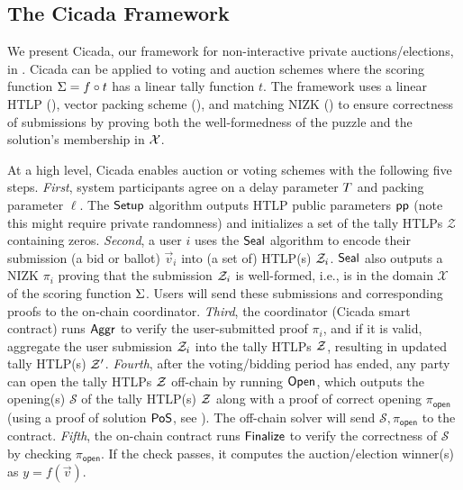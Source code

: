 \subsection{The Cicada Framework}

We present Cicada, our framework for non-interactive private auctions/elections, in . Cicada can be applied to voting and auction schemes where the scoring function $\Sigma = f \circ t$ has a linear tally function $t$. The framework uses a linear HTLP (), vector packing scheme (), and matching NIZK () to ensure correctness of submissions by proving both the well-formedness of the puzzle and the solution's membership in $\mathcal{X}$.

At a high level, Cicada enables auction or voting schemes with the following five steps. 
\emph{First}, system participants agree on a delay parameter $T$ and packing parameter $\ell$. The $\mathsf{Setup}$ algorithm outputs HTLP public parameters $\mathsf{pp}$ (note this might require private randomness) and initializes a set of the tally HTLPs $\mathcal{Z}$ containing zeros. 
\emph{Second}, a user $i$ uses the $\mathsf{Seal}$ algorithm to encode their submission (a bid or ballot) $\vec{v}_i$ into (a set of) HTLP(s) $\mathcal{Z}_i$. $\mathsf{Seal}$ also outputs a NIZK $\pi_i$ proving that the submission $\mathcal{Z}_i$ is well-formed, i.e., is in the domain $\mathcal{X}$ of the scoring function $\Sigma$. Users will send these submissions and corresponding proofs to the on-chain coordinator. 
\emph{Third}, the coordinator (Cicada smart contract) runs $\mathsf{Aggr}$ to verify the user-submitted proof $\pi_i$, and if it is valid, aggregate the user submission $\mathcal{Z}_i$ into the tally HTLPs $\mathcal{Z}$, resulting in updated tally HTLP(s) $\mathcal{Z}'$. 
\emph{Fourth}, after the voting/bidding period has ended, any party can open the tally HTLPs $\mathcal{Z}$ off-chain by running $\mathsf{Open}$, which outputs the opening(s) $\mathcal{S}$ of the tally HTLP(s) $\mathcal{Z}$ along with a proof of correct opening $\pi_{\textsf{open}}$ (using a proof of solution ${\sf PoS}$, see ). The off-chain solver will send $\mathcal{S}, \pi_{\mathsf{open}}$ to the contract. 
\emph{Fifth}, the on-chain contract runs $\mathsf{Finalize}$ to verify the correctness of $\mathcal{S}$ by checking $\pi_{\mathsf{open}}$. If the check passes, it computes the auction/election winner(s) as $y=f(\vec{v})$.


